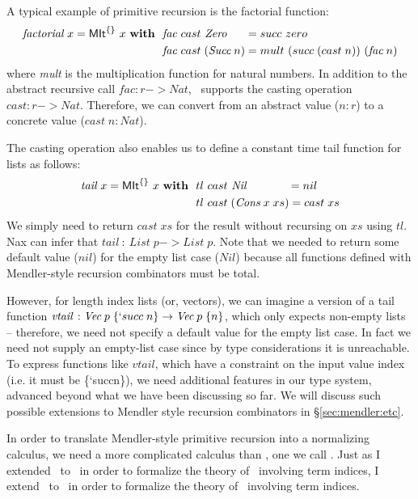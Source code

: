 A typical example of primitive recursion is the factorial function:
\begin{align*}
\textit{factorial}~x = \textsf{MIt}^{\{\}}~x~\textbf{with}~~
&  \textit{fac} ~cast ~\textit{Zero}~~~~\; = succ~zero \\
&  \textit{fac} ~cast \;(\textit{Succ}\;n) = mult~(succ\;(cast\;n))~(\textit{fac}\;n)
\end{align*}
where \textit{mult} is the multiplication function for natural numbers.
In addition to the abstract recursive call $\textit{fac} : r -> \textit{Nat}$,
\MPr\ supports the casting operation $cast : r -> \textit{Nat}$.
Therefore, we can convert from an abstract value ($n : r$) to
a concrete value ($cast\;n : \textit{Nat}$).

The casting operation also enables us to define a constant time tail function for
lists as follows:
\begin{align*}
\textit{tail}~x = \textsf{MIt}^{\{\}}~x~\textbf{with}~~
&  tl ~cast~\textit{Nil}~~~~~~~~~~~ = nil \\
&  tl ~cast\;(\textit{Cons}\;x\;xs) = cast\;xs
\end{align*}
We simply need to return $cast\;xs$ for the result
without recursing on $xs$ using $tl$. Nax can infer that
$\textit{tail} ~:~ \textit{List}\;p -> \textit{List}\;p$.
Note that we needed to return some default value ($nil$) for the empty list case
($Nil$) because all functions defined with Mendler-style recursion combinators
must be total. 

However, for length index lists (or, vectors), we can imagine
a version of a tail function
$\textit{vtail}\,:\textit{Vec}\;p\;\{`succ\;n\} -> \textit{Vec}\;p\;\{n\}$,
which only expects non-empty lists -- therefore, we need not specify a default
value for the empty list case. In fact we need not supply an empty-list case
since by type considerations it is unreachable. To express functions like $vtail$, which have
a constraint on the input value index (i.e. it must be \{`succ\;n\}), 
we need additional features in our type system, advanced beyond
what we have been discussing so far. We will discuss such possible
extensions to Mendler style recursion combinators in \S\ref{sec:mendler:etc}.

In order to translate Mendler-style primitive recursion
into a normalizing calculus, we need a more complicated
calculus than \Fi, one we call \Fixi. Just as I extended \Fw\ to \Fi\ in order to
formalize the theory of \MIt\ involving term indices, I extend \Fixw\
to \Fixi\ in order to formalize the theory of \MPr\ involving term indices.

